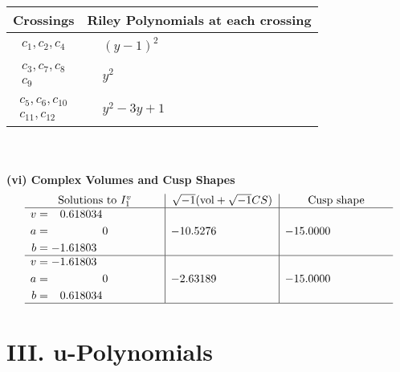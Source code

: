 \documentclass[1p]{elsarticle_modified}
\theoremstyle{definition}
\newcommand{\I}{\sqrt{-1}}
\begin{document}
\begin{tabular}{m{50pt}|m{274pt}}
Crossings & \hspace{64pt}Riley Polynomials at each crossing \\
\hline $$\begin{aligned}c_{1},c_{2},c_{4}\end{aligned}$$&$\begin{aligned}
&(y-1)^2
\end{aligned}$\\
\hline $$\begin{aligned}c_{3},c_{7},c_{8}\\c_{9}\end{aligned}$$&$\begin{aligned}
&y^2
\end{aligned}$\\
\hline $$\begin{aligned}c_{5},c_{6},c_{10}\\c_{11},c_{12}\end{aligned}$$&$\begin{aligned}
&y^2-3 y+1
\end{aligned}$\\
\hline
\end{tabular}\\~\\
\newpage\flushleft \textbf{(vi) Complex Volumes and Cusp Shapes}
$$\begin{array}{c|c|c}  
\text{Solutions to }I^v_{1}& \I (\text{vol} + \sqrt{-1}CS) & \text{Cusp shape}\\
 \hline 
\begin{aligned}
v &= \phantom{-}0.618034\phantom{ +0.000000I} \\
a &= \phantom{-0.000000 } 0 \\
b &= -1.61803\phantom{ +0.000000I}\end{aligned}
 & -10.5276\phantom{ +0.000000I} & -15.0000\phantom{ +0.000000I} \\ \hline\begin{aligned}
v &= -1.61803\phantom{ +0.000000I} \\
a &= \phantom{-0.000000 } 0 \\
b &= \phantom{-}0.618034\phantom{ +0.000000I}\end{aligned}
 & -2.63189\phantom{ +0.000000I} & -15.0000\phantom{ +0.000000I}\\
 \hline 
 \end{array}$$\newpage
\newpage\renewcommand{\arraystretch}{1}
\centering \section*{ III. u-Polynomials}
\end{document}
